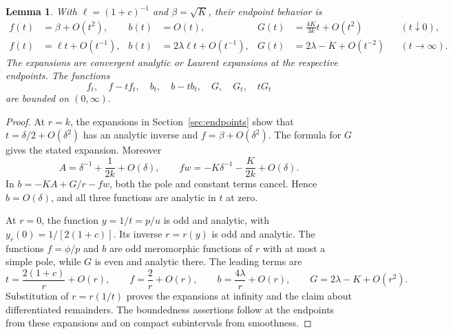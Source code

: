 \documentclass[11pt,letterpaper,reqno]{amsart}
\newtheorem{lemma}[theorem]{Lemma}
\theoremstyle{definition}
\begin{document}
\begin{lemma}\label{lem:flux-endpoints}
With
$\ell=(1+c)^{-1}$ and $\beta=\sqrt K$, their endpoint behavior is
\begin{align*}
 f(t)&=\beta+O(t^2),& b(t)&=O(t),&
 G(t)&=\frac{4K}{3k}t+O(t^2) &&(t\downarrow0),\\
 f(t)&=\ell t+O(t^{-1}),&
 b(t)&=2\lambda\ell t+O(t^{-1}),&
 G(t)&=2\lambda-K+O(t^{-2}) &&(t\to\infty).
\end{align*}
The expansions are convergent analytic or Laurent expansions at the
respective endpoints. The functions
\[
 f_t,\quad f-tf_t,\quad b_t,\quad b-tb_t,
 \quad G,\quad G_t,\quad tG_t
\]
are bounded on $(0,\infty)$.
\end{lemma}
\begin{proof}
At $r=k$, the expansions in Section~\ref{sec:endpoints} show that
$t=\delta/2+O(\delta^2)$ has an analytic inverse and
$f=\beta+O(\delta^2)$. The formula for $G$ gives the stated expansion.
Moreover
\[
 A=\delta^{-1}+\frac1{2k}+O(\delta),\qquad
 fw=-K\delta^{-1}-\frac K{2k}+O(\delta).
\]
In $b=-KA+G/r-fw$, both the pole and constant terms cancel. Hence
$b=O(\delta)$, and all three functions are analytic in $t$ at zero.

At $r=0$, the function $y=1/t=p/u$ is odd and analytic, with
$y_r(0)=1/[2(1+c)]$. Its inverse $r=r(y)$ is odd and analytic.
The functions $f=\phi/p$ and $b$ are odd meromorphic functions of $r$
with at most a simple pole, while $G$ is even and analytic there.
The leading terms are
\[
 t=\frac{2(1+c)}r+O(r),\qquad
 f=\frac2r+O(r),\qquad b=\frac{4\lambda}r+O(r),\qquad
 G=2\lambda-K+O(r^2).
\]
Substitution of $r=r(1/t)$ proves the expansions at infinity and the
claim about differentiated remainders. The boundedness assertions
follow at the endpoints from these expansions and on compact
subintervals from smoothness.
\end{proof}
\end{document}
